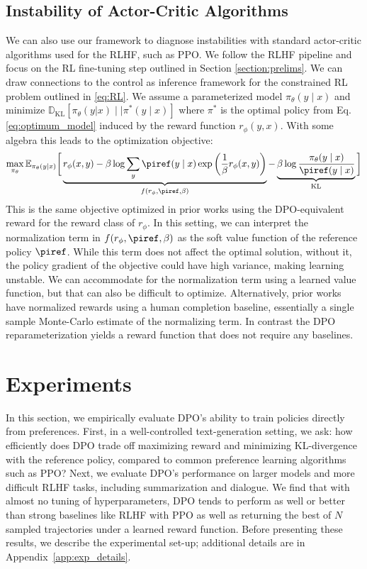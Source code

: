 \subsection{Instability of Actor-Critic Algorithms}
We can also use our framework to diagnose instabilities with standard actor-critic algorithms used for the RLHF, such as PPO. We follow the RLHF pipeline and focus on the RL fine-tuning step outlined in Section \ref{section:prelims}. We can draw connections to the control as inference framework \cite{levine2018reinforcement} for the constrained RL problem outlined in \ref{eq:RL}. We assume a parameterized model $\pi_{\theta}(y\mid x)$ and minimize $\mathbb{D}_{\text{KL}}[\pi_{\theta}(y|x) \mid \mid \pi^*(y\mid x)]$ where $\pi^*$ is the optimal policy from Eq. \ref{eq:optimum_model} induced by the reward function $r_{\phi}(y, x)$. With some algebra this leads to the optimization objective:
\begin{equation}\label{eq:AC}
    \max_{\pi_{\theta}}\mathbb{E}_{\pi_{\theta}(y\mid x)}\bigg[\underbrace{r_{\phi}(x, y) -\beta\log\sum_{y}\piref(y\mid x)\exp\left(\frac{1}{\beta}r_{\phi}(x, y)\right)}_{f(r_{\phi}, \piref, \beta)} - \underbrace{\beta\log\frac{\pi_{\theta}(y\mid x)}{\piref(y\mid x)}}_{\text{KL}}\bigg]
\end{equation}
This is the same objective optimized in prior works 
\citep{ziegler2020finetuning, stiennon2022learning, bai2022training, ouyang2022training} using the DPO-equivalent reward for the reward class of $r_{\phi}$. In this setting, we can interpret the normalization term in $f(r_{\phi}, \piref, \beta)$ as the soft value function of the reference policy $\piref$. While this term does not affect the optimal solution, without it, the policy gradient of the objective could have high variance, making learning unstable. We can accommodate for the normalization term using a learned value function, but that can also be difficult to optimize. Alternatively, prior works have normalized rewards using a human completion baseline, essentially a single sample Monte-Carlo estimate of the normalizing term. In contrast the DPO reparameterization yields a reward function that does not require any baselines. 


\section{Experiments}
In this section, we empirically evaluate DPO's ability to train policies directly from preferences. First, in a well-controlled text-generation setting, we ask: how efficiently does DPO trade off maximizing reward and minimizing KL-divergence with the reference policy, compared to common preference learning algorithms such as PPO? Next, we evaluate DPO's performance on larger models and more difficult RLHF tasks, including summarization and dialogue. We find that with almost no tuning of hyperparameters, DPO tends to perform as well or better than strong baselines like RLHF with PPO as well as returning the best of $N$ sampled trajectories under a learned reward function. Before presenting these results, we describe the experimental set-up; additional details are in Appendix~\ref{app:exp_details}.


